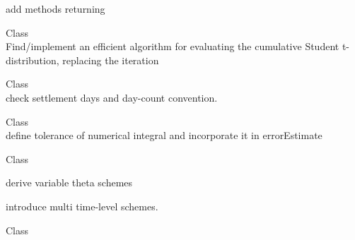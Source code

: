\begin{DoxyRefList}
add methods returning   
\item[Class \doxylink{class_quant_lib_1_1_inverse_cumulative_student}{Quant\+Lib\+::Inverse\+Cumulative\+Student} ]\hfill \\
\label{todo__todo000046}%
%
Find/implement an efficient algorithm for evaluating the cumulative Student t-\/distribution, replacing the  iteration  
\item[Class \doxylink{class_quant_lib_1_1_jibar}{Quant\+Lib\+::Jibar} ]\hfill \\
\label{todo__todo000031}%
%
check settlement days and day-\/count convention.  
\item[Class \doxylink{class_quant_lib_1_1_m_c_variance_swap_engine}{Quant\+Lib\+::MCVariance\+Swap\+Engine\texorpdfstring{$<$}{<} RNG, S \texorpdfstring{$>$}{>}} ]\hfill \\
\label{todo__todo000063}%
%
define tolerance of numerical integral and incorporate it in error\+Estimate 
\item[Class \doxylink{class_quant_lib_1_1_mixed_scheme}{Quant\+Lib\+::Mixed\+Scheme\texorpdfstring{$<$}{<} Operator \texorpdfstring{$>$}{>}} ]\hfill \\
\label{todo__todo000057}%
%

\begin{DoxyItemize}
\item derive variable theta schemes
\item introduce multi time-\/level schemes.
\end{DoxyItemize}
\item[Class \doxylink{class_quant_lib_1_1_multi_cubic_spline}{Quant\+Lib\+::Multi\+Cubic\+Spline\texorpdfstring{$<$}{<} i \texorpdfstring{$>$}{>}} ]\hfill \\
\label{todo__todo000049}%
%


\end{DoxyRefList}
